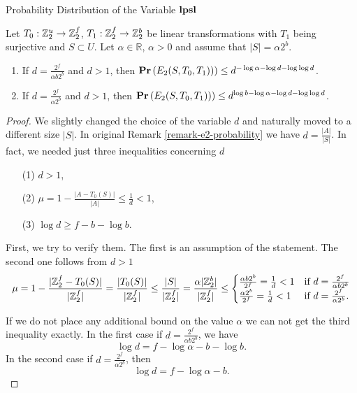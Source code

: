 \begin{section}{Probability Distribution of the Variable \texorpdfstring{$\mathbf{lpsl}$}{lpsl}}
\begin{statement}
\label{statement-e2-probability-linear-good}
Let $T_0: \mathbb{Z}_{2}^{u} \rightarrow \mathbb{Z}_{2}^{f}$, $T_1: \mathbb{Z}_{2}^{f} \rightarrow \mathbb{Z}_{2}^{b}$ be linear transformations with $T_1$ being surjective and $S \subset U$. Let $\alpha \in \mathbb{R}$, $\alpha > 0$ and assume that $|S| = \alpha 2 ^ b$.
\begin{enumerate}
\item If $d = \frac{2 ^ f}{\alpha b 2 ^ b}$ and $d > 1$, then $\mathbf{Pr}\left(E_2(S, T_0, T_1))\right) \leq d ^ {-\log \alpha - \log d - \log \log d}$.
\item If $d = \frac{2 ^ f}{\alpha 2 ^ b}$ and $d > 1$, then $\mathbf{Pr}\left(E_2(S, T_0, T_1))\right) \leq d ^ {\log b - \log \alpha - \log d - \log \log d}$.
\end{enumerate}
\end{statement}
\begin{proof}
We slightly changed the choice of the variable $d$ and naturally moved to a different size $|S|$. In original Remark \ref{remark-e2-probability} we have $d = \frac{|A|}{|S|}$. In fact, we needed just three inequalities concerning $d$
\begin{enumerate}
\item [(1)] $d > 1$,
\item [(2)] $\mu = 1 - \frac{|A - T_0(S)|}{|A|} \leq \frac{1}{d} < 1$,
\item [(3)] $\log d \geq f - b - \log b$.
\end{enumerate}

First, we try to verify them. The first is an assumption of the statement. The second one follows from $d > 1$
\[
	\mu = 1 - \frac{|\mathbb{Z}_{2}^{f} - T_0(S)|}{|\mathbb{Z}_{2}^{f}|} = \frac{|T_0(S)|}{|\mathbb{Z}_{2}^{f}|} \leq \frac{|S|}{|\mathbb{Z}_{2}^{f}|} = \frac{\alpha |\mathbb{Z}_{2}^{b}|}{|\mathbb{Z}_{2}^{f}|} \leq 
\begin{cases}
\frac{\alpha b 2 ^ b}{2 ^ f} = \frac{1}{d} < 1 & \text{if } d = \frac{2 ^ f}{\alpha b 2 ^ b} \\
\frac{\alpha 2 ^ b}{2 ^ f} = \frac{1}{d} < 1 & \text{if } d = \frac{2 ^ f}{\alpha 2 ^ b} \text{.}
\end{cases}
\]

If we do not place any additional bound on the value $\alpha$ we can not get the third inequality exactly. In the first case if $d = \frac{2 ^ f}{\alpha b 2 ^ b}$, we have 
\[
	\log d = f - \log \alpha - b - \log b \text{.}
\]
In the second case if $d = \frac{2 ^ f}{\alpha 2 ^ b}$, then
\[
	\log d = f - \log \alpha - b \text{.}
\]


\end{proof}
\end{section}
